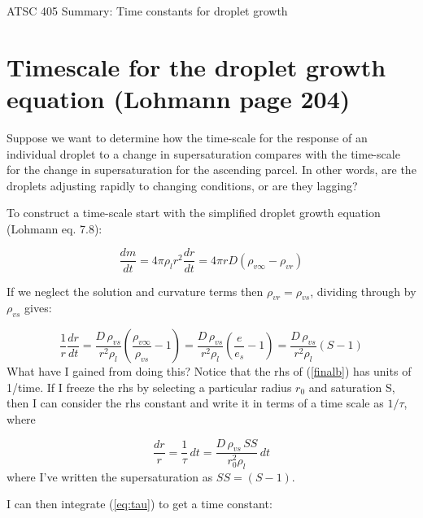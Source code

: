 \documentclass[12pt]{article}
\begin{document}
\pagestyle{first}

\begin{center}
ATSC 405 Summary:  Time constants for droplet growth\\
\end{center}



\section{Timescale for the droplet growth equation (Lohmann page 204)}
\label{sec:drop}

Suppose we want to determine how the time-scale for
the response of an individual droplet to a change in supersaturation
compares with the time-scale for the change in supersaturation for the
ascending parcel.  In other words, are the droplets adjusting rapidly
to changing conditions, or are they lagging?

To construct a time-scale 
start with the simplified droplet growth equation (Lohmann eq. 7.8):

\begin{equation}
  \label{finala}
  \frac{dm}{dt} = 4 \pi \rho_l r^2 \frac{dr}{dt} = 4 \pi r D (\rho_{v \infty} - \rho_{v r})
\end{equation}

If we neglect the solution and curvature terms then $\rho_{v r}=\rho_{v s}$,  dividing through
by $\rho_{v s}$ gives:

\begin{equation}
  \label{finalb}
  \frac{1}{r}\frac{dr}{dt} = \frac{D\, \rho_{v s}}{r^2 \rho_l} \left (\frac{\rho_{v \infty}}{\rho_{v s}} - 1 \right )
      = \frac{D\,\rho_{v s}}{r^2 \rho_l } \left (\frac{e}{e_s} - 1 \right ) =\frac{D\,\rho_{v s}}{r^2 \rho_l }(S - 1)
\end{equation}
What have I gained from doing this?  Notice that the rhs of
(\ref{finalb}) has units of 1/time.  If I freeze the rhs by selecting
a particular radius $r_0$ and saturation S, then I can consider the
rhs constant and  write it in terms of a time scale as $1/\tau$, where

\begin{equation}
  \label{eq:tau}
  \frac{dr}{r} = \frac{1}{\tau} \,dt  = \frac{D\,\rho_{v s}\,SS}{r_0^2 \rho_l }\,dt
\end{equation}
where I've written the supersaturation as $SS=(S-1)$.

I can then
integrate (\ref{eq:tau}) to get  a time constant:
\end{document}
